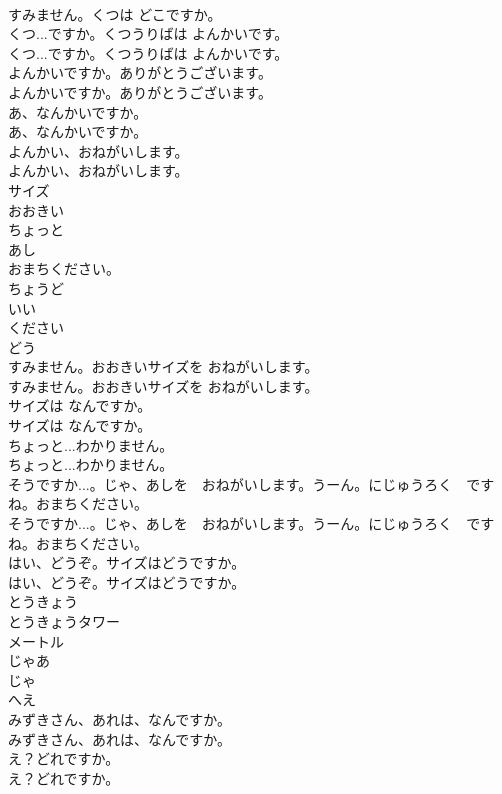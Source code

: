\documentclass[8pt]{extreport}
\begin{document}
\begin{CJK}{UTF8}{min}
\\	すみません。くつは どこですか。 
\\	くつ...ですか。くつうりばは よんかいです。	
\\	くつ...ですか。くつうりばは よんかいです。 
\\	よんかいですか。ありがとうございます。	
\\	よんかいですか。ありがとうございます。 
\\	あ、なんかいですか。	
\\	あ、なんかいですか。 
\\	よんかい、おねがいします。	
\\	よんかい、おねがいします。 
\\	サイズ
\\	おおきい
\\	ちょっと
\\	あし
\\	おまちください。
\\	ちょうど
\\	いい
\\	ください
\\	どう
\\	すみません。おおきいサイズを おねがいします。	
\\	すみません。おおきいサイズを おねがいします。 
\\	サイズは なんですか。	
\\	サイズは なんですか。 
\\	ちょっと...わかりません。	
\\	ちょっと...わかりません。 
\\	そうですか...。じゃ、あしを　おねがいします。うーん。にじゅうろく　ですね。おまちください。	
\\	そうですか...。じゃ、あしを　おねがいします。うーん。にじゅうろく　ですね。おまちください。 
\\	はい、どうぞ。サイズはどうですか。	
\\	はい、どうぞ。サイズはどうですか。 
\\	とうきょう
\\	とうきょうタワー
\\	メートル
\\	じゃあ 
\\	じゃ
\\	へえ
\\	みずきさん、あれは、なんですか。	
\\	みずきさん、あれは、なんですか。 
\\	え？どれですか。	
\\	え？どれですか。 

\end{CJK}
\end{document}
